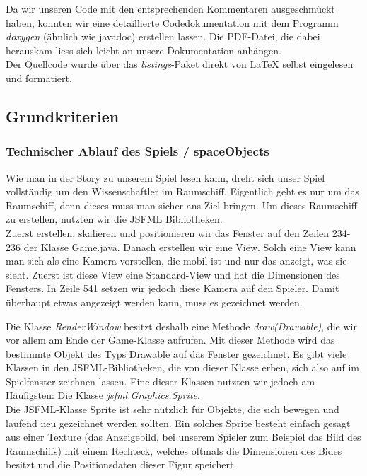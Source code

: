 \documentclass[12pt,a4paper]{scrartcl}
\begin{document}
Da wir unseren Code mit den entsprechenden Kommentaren ausgeschmückt haben,
konnten wir eine detaillierte Codedokumentation mit dem Programm \textit{doxygen} (ähnlich wie javadoc) erstellen lassen.
Die PDF-Datei, die dabei herauskam liess sich leicht an unsere Dokumentation anhängen.\\

Der Quellcode wurde über das \textit{listings}-Paket direkt von LaTeX selbst eingelesen und formatiert.

\subsection{Grundkriterien}

\subsubsection{Technischer Ablauf des Spiels / spaceObjects}
Wie man in der Story zu unserem Spiel lesen kann, dreht sich unser Spiel vollständig um den Wissenschaftler im Raumschiff. Eigentlich geht es nur um das Raumschiff, denn dieses muss man sicher ans Ziel bringen.
Um dieses Raumschiff zu erstellen, nutzten wir die JSFML Bibliotheken.	\\

Zuerst erstellen, skalieren und positionieren wir das Fenster auf den Zeilen 234-236 der Klasse Game.java.
Danach erstellen wir eine View.
Solch eine View kann man sich als eine Kamera vorstellen, die mobil ist und nur das anzeigt, was sie sieht.
Zuerst ist diese View eine Standard-View und hat die Dimensionen des Fensters.
In Zeile 541 setzen wir jedoch diese Kamera auf den Spieler.
Damit überhaupt etwas angezeigt werden kann, muss es gezeichnet werden. 

Die Klasse \textit{RenderWindow} besitzt deshalb eine Methode \textit{draw(Drawable)}, die wir vor allem am Ende der Game-Klasse aufrufen.
Mit dieser Methode wird das bestimmte Objekt des Typs Drawable auf das Fenster gezeichnet.
Es gibt viele Klassen in den JSFML-Bibliotheken, die von dieser Klasse erben, sich also auf im Spielfenster zeichnen lassen.
Eine dieser Klassen nutzten wir jedoch am Häufigsten: Die Klasse \textit{jsfml.Graphics.Sprite}.		\\
Die JSFML-Klasse Sprite ist sehr nützlich für Objekte, die sich bewegen und laufend neu gezeichnet werden sollten.
Ein solches Sprite besteht einfach gesagt aus einer Texture (das Anzeigebild, bei unserem Spieler zum Beispiel das Bild des Raumschiffs) mit einem Rechteck,
welches oftmals die Dimensionen des Bides besitzt und die Positionsdaten dieser Figur speichert.
\end{document}
